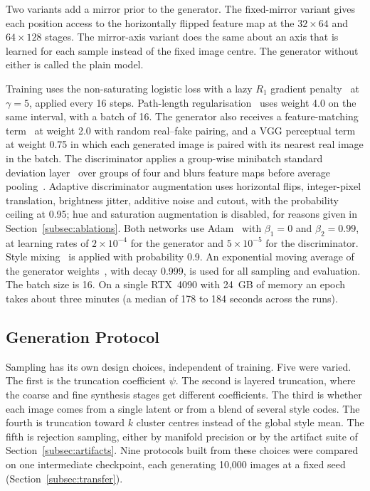 \documentclass[electronics,article,submit,pdftex,moreauthors]{Definitions/mdpi}
\begin{document}
Two variants add a mirror prior to the generator. The fixed-mirror variant
gives each position access to the horizontally flipped feature map at the
$32 \times 64$ and $64 \times 128$ stages. The mirror-axis variant does the
same about an axis that is learned for each sample instead of the fixed
image centre. The generator without either is called the plain model.

Training uses the non-saturating logistic loss with a lazy $R_1$ gradient
penalty~\cite{mescheder2018converge} at $\gamma = 5$, applied every 16 steps.
Path-length regularisation~\cite{karras2020stylegan2} uses weight 4.0 on the
same interval, with a batch of 16. The generator also receives a
feature-matching term~\cite{salimans2016improved} at weight 2.0 with random
real--fake pairing, and a VGG perceptual term~\cite{simonyan2015vgg} at
weight 0.75 in which each generated image is paired with its nearest real
image in the batch. The discriminator applies a group-wise
minibatch standard deviation layer~\cite{karras2018progressive} over groups of
four and blurs feature maps before average
pooling~\cite{zhang2019shiftinvariant}. Adaptive discriminator
augmentation uses horizontal flips, integer-pixel translation, brightness
jitter, additive noise and cutout, with the probability ceiling at 0.95; hue
and saturation augmentation is disabled, for reasons given in
Section~\ref{subsec:ablations}. Both networks use Adam~\cite{kingma2015adam} with $\beta_1 = 0$ and
$\beta_2 = 0.99$, at learning rates of $2 \times 10^{-4}$ for the generator and
$5 \times 10^{-5}$ for the discriminator. Style mixing~\cite{karras2019stylegan}
is applied with probability 0.9. An exponential moving average of the
generator weights~\cite{karras2018progressive}, with decay 0.999, is used for
all sampling and evaluation. The batch size is 16. On a single RTX~4090
with 24~GB of memory an epoch takes about three minutes (a median of 178 to 184 seconds across the runs).

\subsection{Generation Protocol}
\label{subsec:generation}

Sampling has its own design choices, independent of training. Five were
varied. The first is the truncation coefficient $\psi$. The second is layered
truncation, where the coarse and fine synthesis stages get different
coefficients. The third is whether each image comes from a single latent or
from a blend of several style codes. The fourth is truncation toward $k$
cluster centres instead of the global style mean. The fifth is rejection
sampling, either by manifold precision or by the artifact suite of
Section~\ref{subsec:artifacts}. Nine protocols built from these choices were
compared on one intermediate checkpoint, each generating 10,000 images at a
fixed seed (Section~\ref{subsec:transfer}).
\end{document}
